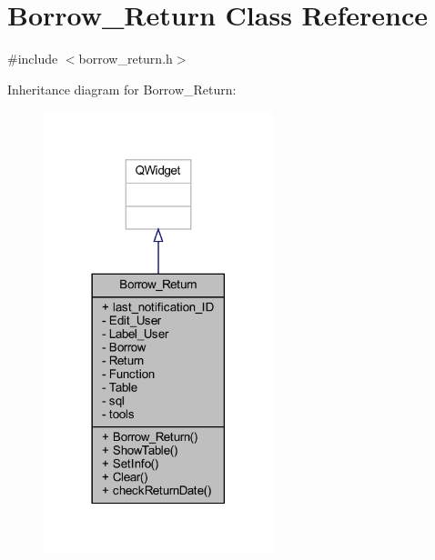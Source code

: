 \hypertarget{class_borrow___return}{}\section{Borrow\+\_\+\+Return Class Reference}
\label{class_borrow___return}


{\ttfamily \#include $<$borrow\+\_\+return.\+h$>$}



Inheritance diagram for Borrow\+\_\+\+Return\+:
\nopagebreak
\begin{figure}[H]
\begin{center}
\leavevmode
\includegraphics[width=189pt]{class_borrow___return__inherit__graph}
\end{center}
\end{figure}


